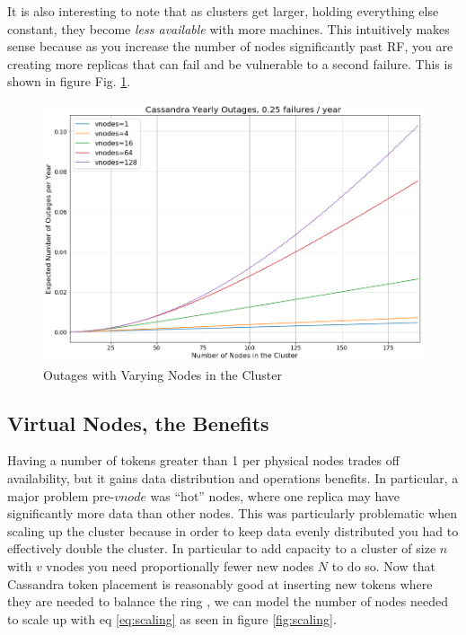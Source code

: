 \documentclass{article}
\begin{document}
It is also interesting to note that as clusters get larger, holding everything else constant, they become \textit{less available} with more machines. This intuitively makes sense because as you increase the number of nodes significantly past RF, you are creating more replicas that can fail and be vulnerable to a second failure. This is shown in figure Fig. \ref{fig:outages_nodes}.

\begin{figure}[H]
    \centering
    \includegraphics[width=1.0\textwidth]{images/outages_nodes.png}
    \caption{Outages with Varying Nodes in the Cluster}
    \label{fig:outages_nodes}
\end{figure}


\subsection{Virtual Nodes, the Benefits}
Having a number of tokens greater than 1 per physical nodes trades off availability, but it gains data distribution and operations benefits. In particular, a major problem pre-$vnode$ was ``hot'' nodes, where one replica may have significantly more data than other nodes. This was particularly problematic when scaling up the cluster because in order to keep data evenly distributed you had to effectively double the cluster. In particular to add capacity to a cluster of size $n$ with $v$ vnodes you need proportionally fewer new nodes $N$ to do so. Now that Cassandra token placement is reasonably good at inserting new tokens where they are needed to balance the ring \cite{tokenallocation}, we can model the number of nodes needed to scale up with eq \ref{eq:scaling} as seen in figure \ref{fig:scaling}.
\end{document}
